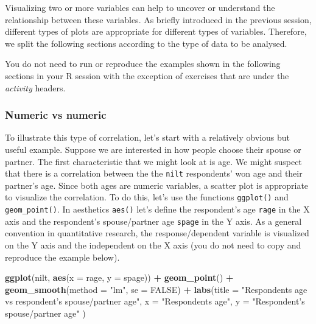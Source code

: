 \documentclass[
]{book}
\newenvironment{Shaded}{\begin{snugshade}}{\end{snugshade}}
\newcommand{\AttributeTok}[1]{\textcolor[rgb]{0.13,0.29,0.53}{#1}}
\newcommand{\ConstantTok}[1]{\textcolor[rgb]{0.56,0.35,0.01}{#1}}
\newcommand{\FunctionTok}[1]{\textcolor[rgb]{0.13,0.29,0.53}{\textbf{#1}}}
\newcommand{\NormalTok}[1]{#1}
\newcommand{\SpecialCharTok}[1]{\textcolor[rgb]{0.81,0.36,0.00}{\textbf{#1}}}
\newcommand{\StringTok}[1]{\textcolor[rgb]{0.31,0.60,0.02}{#1}}
\begin{document}
Visualizing two or more variables can help to uncover or understand the relationship between these variables. As briefly introduced in the previous session, different types of plots are appropriate for different types of variables. Therefore, we split the following sections according to the type of data to be analysed.

You do not need to run or reproduce the examples shown in the following sections in your R session with the exception of exercises that are under the \emph{activity} headers.

\hypertarget{numeric-vs-numeric}{%
\subsubsection{Numeric vs numeric}\label{numeric-vs-numeric}}

To illustrate this type of correlation, let's start with a relatively obvious but useful example. Suppose we are interested in how people choose their spouse or partner. The first characteristic that we might look at is age. We might suspect that there is a correlation between the the \texttt{nilt} respondents' won age and their partner's age. Since both ages are numeric variables, a scatter plot is appropriate to visualize the correlation. To do this, let's use the functions \texttt{ggplot()} and \texttt{geom\_point()}. In aesthetics \texttt{aes()} let's define the respondent's age \texttt{rage} in the X axis and the respondent's spouse/partner age \texttt{spage} in the Y axis. As a general convention in quantitative research, the response/dependent variable is visualized on the Y axis and the independent on the X axis (you do not need to copy and reproduce the example below).

\begin{Shaded}
\begin{Highlighting}[]
\FunctionTok{ggplot}\NormalTok{(nilt, }\FunctionTok{aes}\NormalTok{(}\AttributeTok{x =}\NormalTok{ rage, }\AttributeTok{y =}\NormalTok{ spage)) }\SpecialCharTok{+} 
  \FunctionTok{geom\_point}\NormalTok{() }\SpecialCharTok{+}
  \FunctionTok{geom\_smooth}\NormalTok{(}\AttributeTok{method =} \StringTok{"lm"}\NormalTok{, }\AttributeTok{se =} \ConstantTok{FALSE}\NormalTok{) }\SpecialCharTok{+}
  \FunctionTok{labs}\NormalTok{(}\AttributeTok{title =} \StringTok{"Respondent\textquotesingle{}s age vs respondent’s spouse/partner age"}\NormalTok{, }
       \AttributeTok{x =} \StringTok{"Respondent\textquotesingle{}s age"}\NormalTok{, }\AttributeTok{y =} \StringTok{"Respondent’s spouse/partner age"}\NormalTok{ )}
\end{Highlighting}
\end{Shaded}
\end{document}
